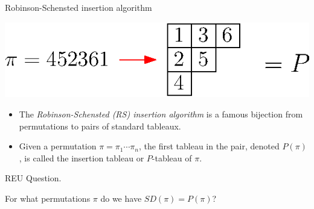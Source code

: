 \documentclass[aspectratio=169, serif]{beamer}
\begin{document}
\begin{frame}{Robinson-Schensted insertion algorithm}
        \begin{center}
            \includegraphics[scale = 0.8]{RS_Example.eps}
        \end{center}
\begin{itemize}        
\item The \textit{Robinson-Schensted (RS) insertion algorithm} is a famous 
bijection from permutations to pairs of standard tableaux. 
\item Given a permutation $\pi = \pi_1\cdots\pi_n$, 
the first tableau in the pair, denoted $P(\pi)$, is called the insertion tableau or $P$-tableau of $\pi$. 
\end{itemize} 
        
    
        \begin{block}{REU Question.}
    
     For what permutations $\pi$ do we have  $SD(\pi)=P(\pi)$?
    
    \end{block}
    
\end{frame}
\end{document}
